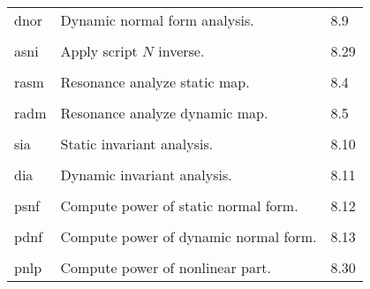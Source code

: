 \begin{center}
\begin{tabular}{lll}
\hspace{1.5em}dnor    &           Dynamic normal form analysis.  &  \hspace{2em}8.9\\
\vspace{-3mm}& &\\
\hspace{1.5em}asni    &           Apply script $N$ inverse.     &   \hspace{2em}8.29\\
\vspace{-3mm}& &\\
\hspace{1.5em}rasm    &           Resonance analyze static map.  &  \hspace{2em}8.4\\
\vspace{-3mm}& &\\
\hspace{1.5em}radm    &           Resonance analyze dynamic map. &  \hspace{2em}8.5\\
\vspace{-3mm}& &\\
\hspace{1.5em}sia     &           Static invariant analysis.     &  \hspace{2em}8.10\\
\vspace{-3mm}& &\\
\hspace{1.5em}dia     &           Dynamic invariant analysis.    &  \hspace{2em}8.11\\
\vspace{-3mm}& &\\
\hspace{1.5em}psnf    &    Compute power of static normal form.&  \hspace{2em}8.12\\
\vspace{-3mm}& &\\
\hspace{1.5em}pdnf    &    Compute power of dynamic normal form.&  \hspace{2em}8.13\\
\vspace{-3mm}& &\\
\hspace{1.5em}pnlp    &           Compute power of nonlinear part. & \hspace{2em}8.30\\

\end{tabular}
\end{center}
